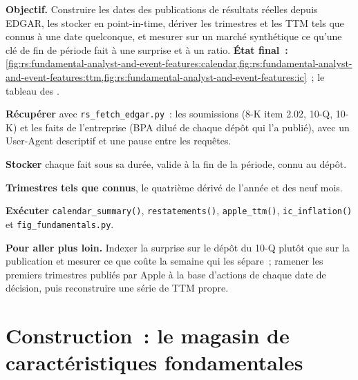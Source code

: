 \begin{tutorial}
\textbf{Objectif.} Construire les dates des publications de résultats réelles depuis EDGAR, les stocker en point-in-time, dériver les trimestres et les TTM tels que connus à
une date quelconque, et mesurer sur un marché synthétique ce qu'une clé de fin de période fait à une surprise et à un ratio. \textbf{État final~:}
\cref{fig:rs:fundamental-analyst-and-event-features:calendar,fig:rs:fundamental-analyst-and-event-features:ttm,fig:rs:fundamental-analyst-and-event-features:ic}~;
le tableau des .
\begin{tutsteps}
\item \textbf{Récupérer} avec \texttt{rs\_fetch\_edgar.py}~: les soumissions (8-K item 2.02, 10-Q, 10-K) et les faits de l'entreprise (BPA dilué de chaque dépôt
qui l'a publié), avec un User-Agent descriptif et une pause entre les requêtes.
\item \textbf{Stocker} chaque fait sous sa durée, valide à la fin de la période, connu au dépôt.
\label{lst:rs:fundamental-analyst-and-event-features:load}
\item \textbf{Trimestres tels que connus}, le quatrième dérivé de l'année et des neuf mois.
\label{lst:rs:fundamental-analyst-and-event-features:quarterly}
\item \textbf{Exécuter} \texttt{calendar\_summary()}, \texttt{restatements()}, \texttt{apple\_ttm()}, \texttt{ic\_inflation()} et
\texttt{fig\_fundamentals.py}.
\end{tutsteps}
\textbf{Pour aller plus loin.} Indexer la surprise sur le dépôt du 10-Q plutôt que sur la publication et mesurer ce que coûte la semaine qui les sépare~;
ramener les premiers trimestres publiés par Apple à la base d'actions de chaque date de décision, puis reconstruire une série de TTM propre.
\end{tutorial}

\section{Construction~: le magasin de caractéristiques fondamentales}\label{bld:rs:fundamental-analyst-and-event-features:fundpit}

